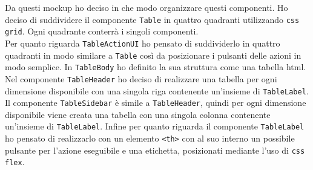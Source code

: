 Da questi mockup ho deciso in che modo organizzare questi componenti. Ho deciso di suddividere il componente \verb|Table| in quattro quadranti utilizzando \verb|css grid|. Ogni quadrante conterrà i singoli componenti. \\
Per quanto riguarda \verb|TableActionUI| ho pensato di suddividerlo in quattro quadranti in modo similare a \verb|Table| così da posizionare i pulsanti delle azioni in modo semplice.
In \verb|TableBody| ho definito la sua struttura come una tabella html.
Nel componente \verb|TableHeader| ho deciso di realizzare una tabella per ogni dimensione disponibile con una singola riga contenente un'insieme di \verb|TableLabel|.
Il componente \verb|TableSidebar| è simile a \verb|TableHeader|, quindi per ogni dimensione disponibile viene creata una tabella con una singola colonna contenente un'insieme di \verb|TableLabel|.
Infine per quanto riguarda il componente \verb|TableLabel| ho pensato di realizzarlo con un elemento \verb|<th>| con al suo interno un possibile pulsante per l'azione eseguibile e una etichetta, posizionati mediante l'uso di \verb|css flex|.














